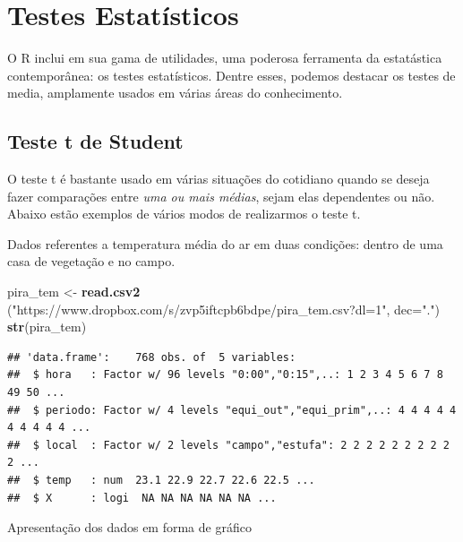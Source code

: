 \documentclass[
]{book}
\newenvironment{Shaded}{\begin{snugshade}}{\end{snugshade}}
\newcommand{\DataTypeTok}[1]{\textcolor[rgb]{0.13,0.29,0.53}{#1}}
\newcommand{\KeywordTok}[1]{\textcolor[rgb]{0.13,0.29,0.53}{\textbf{#1}}}
\newcommand{\NormalTok}[1]{#1}
\newcommand{\StringTok}[1]{\textcolor[rgb]{0.31,0.60,0.02}{#1}}
\begin{document}
\hypertarget{testes-estatuxedsticos}{%
\chapter{Testes Estatísticos}\label{testes-estatuxedsticos}}

O R inclui em sua gama de utilidades, uma poderosa ferramenta da estatástica contemporânea: os testes estatísticos. Dentre esses, podemos destacar os testes de media, amplamente usados em várias áreas do conhecimento.

\hypertarget{teste-t-de-student}{%
\section{Teste t de Student}\label{teste-t-de-student}}

O teste t é bastante usado em várias situações do cotidiano quando se deseja fazer comparações entre \emph{uma ou mais médias}, sejam elas dependentes ou não.
Abaixo estão exemplos de vários modos de realizarmos o teste t.

Dados referentes a temperatura média do ar em duas condições: dentro de uma casa de vegetação e no campo.

\begin{Shaded}
\begin{Highlighting}[]
\NormalTok{pira_tem <-}\StringTok{ }\KeywordTok{read.csv2}\NormalTok{ (}\StringTok{"https://www.dropbox.com/s/zvp5iftcpb6bdpe/pira_tem.csv?dl=1"}\NormalTok{,}
  \DataTypeTok{dec=}\StringTok{"."}\NormalTok{)}
\KeywordTok{str}\NormalTok{(pira_tem)}
\end{Highlighting}
\end{Shaded}

\begin{verbatim}
## 'data.frame':    768 obs. of  5 variables:
##  $ hora   : Factor w/ 96 levels "0:00","0:15",..: 1 2 3 4 5 6 7 8 49 50 ...
##  $ periodo: Factor w/ 4 levels "equi_out","equi_prim",..: 4 4 4 4 4 4 4 4 4 4 ...
##  $ local  : Factor w/ 2 levels "campo","estufa": 2 2 2 2 2 2 2 2 2 2 ...
##  $ temp   : num  23.1 22.9 22.7 22.6 22.5 ...
##  $ X      : logi  NA NA NA NA NA NA ...
\end{verbatim}

Apresentação dos dados em forma de gráfico
\end{document}
